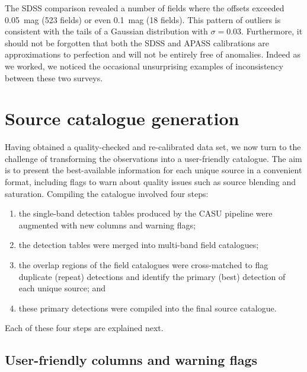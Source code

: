 \documentclass[a4paper,useAMS,usenatbib]{mn2e}
\begin{document}
The SDSS comparison revealed a number of fields where the offsets
exceeded 0.05~mag (523 fields) or even 0.1~mag (18 fields).
This pattern of outliers is consistent with the tails of a Gaussian distribution
with $\sigma=0.03$.  Furthermore, it should not
be forgotten that both the SDSS and APASS calibrations are approximations to
perfection and will not be entirely free of anomalies.  Indeed as we worked, 
we noticed the occasional unsurprising examples of inconsistency between these 
two surveys.


\section{Source catalogue generation}
\label{sec:catalogue}

Having obtained a quality-checked 
and re-calibrated data set, 
we now turn to the challenge
of transforming the observations 
into a user-friendly catalogue.
The aim is to present
the best-available information for each unique source
in a convenient format,
including flags to warn about quality issues 
such as source blending and saturation.
Compiling the catalogue involved four steps:
\begin{enumerate}
\item the single-band detection tables 
produced by the CASU pipeline 
were augmented with new columns
and warning flags;
\item the detection tables were merged into multi-band field catalogues;
\item the overlap regions of the field catalogues 
were cross-matched to flag duplicate (repeat) detections 
and identify the primary (best) detection 
of each unique source; and
\item these primary detections
were compiled into the final source catalogue.
\end{enumerate}
Each of these four steps are explained next.

\subsection{User-friendly columns and warning flags}
\end{document}
